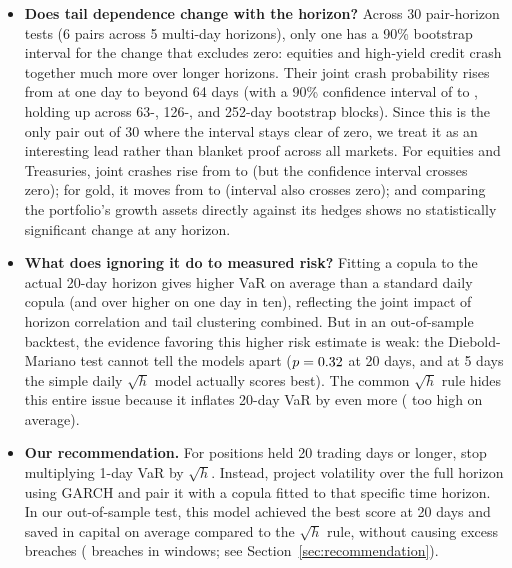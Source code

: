 \documentclass[11pt,a4paper]{article}
\begin{document}
\begin{itemize}[leftmargin=1.2em]
\item \textbf{Does tail dependence change with the horizon?} Across 30 pair-horizon tests (6 pairs across 5 multi-day horizons), only one has a 90\% bootstrap interval for the change that excludes zero: equities and high-yield credit crash together much more over longer horizons. Their joint crash probability rises from \SpyHygDaily{} at one day to \SpyHygLong{} beyond 64 days (with a 90\% confidence interval of \SpyHygChangeLow{} to \SpyHygChangeHigh{}, holding up across 63-, 126-, and 252-day bootstrap blocks). Since this is the only pair out of 30 where the interval stays clear of zero, we treat it as an interesting lead rather than blanket proof across all markets. For equities and Treasuries, joint crashes rise from \SpyTltDaily{} to \SpyTltLong{} (but the confidence interval crosses zero); for gold, it moves from \SpyGldDaily{} to \SpyGldLong{} (interval also crosses zero); and comparing the portfolio's growth assets directly against its hedges shows no statistically significant change at any horizon.
\item \textbf{What does ignoring it do to measured risk?} Fitting a copula to the actual 20-day horizon gives \GapTwenty{} higher VaR on average than a standard daily copula (and over \GapTwentyTop{} higher on one day in ten), reflecting the joint impact of horizon correlation and tail clustering combined. But in an out-of-sample backtest, the evidence favoring this higher risk estimate is weak: the Diebold-Mariano test cannot tell the models apart ($p = 0.32$ at 20 days, and at 5 days the simple daily $\sqrt{h}$ model actually scores best). The common $\sqrt{h}$ rule hides this entire issue because it inflates 20-day VaR by even more (\SqrtTwenty{} too high on average).
\item \textbf{Our recommendation.} For positions held 20 trading days or longer, stop multiplying 1-day VaR by $\sqrt{h}$. Instead, project volatility over the full horizon using GARCH and pair it with a copula fitted to that specific time horizon. In our out-of-sample test, this model achieved the best score at 20 days and saved \HorizonSavingTwenty{} in capital on average compared to the $\sqrt{h}$ rule, without causing excess breaches (\BreachTwentyHorizon{} breaches in \ObsTwenty{} windows; see Section~\ref{sec:recommendation}).
\end{itemize}

\end{document}
